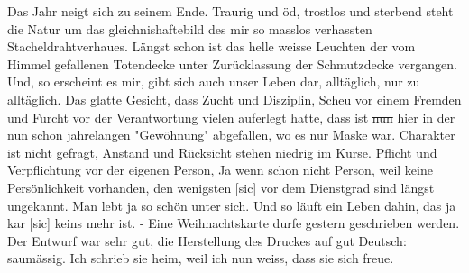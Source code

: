 \def\day{20. November 1942 *}
\mktitle

Das Jahr neigt sich zu seinem Ende.
Traurig und \"{o}d, trostlos und sterbend steht die Natur um das gleichnishaftebild des mir so masslos verhassten Stacheldrahtverhaues.
L\"{a}ngst schon ist das helle weisse Leuchten der vom Himmel gefallenen Totendecke unter Zur\"{u}cklassung der Schmutzdecke vergangen.
Und, so erscheint es mir, gibt sich auch unser Leben dar, allt\"{a}glich, nur zu allt\"{a}glich.
Das glatte Gesicht, dass Zucht und Disziplin, Scheu vor einem Fremden und Furcht vor der Verantwortung vielen auferlegt hatte, dass ist \st{nun} hier in der nun schon jahrelangen "Gew\"{o}hnung" abgefallen, wo es nur Maske war.
Charakter ist nicht gefragt, Anstand und R\"{u}cksicht stehen niedrig im Kurse.
Pflicht und Verpflichtung vor der eigenen Person, Ja wenn schon nicht Person, weil keine Pers\"{o}nlichkeit vorhanden, den wenigsten{\color{red} [sic] } vor dem Dienstgrad sind l\"{a}ngst ungekannt.
Man lebt ja so sch\"{o}n unter sich.
Und so l\"{a}uft ein Leben dahin, das ja kar{\color{red} [sic] } keins mehr ist.
- Eine Weihnachtskarte durfe gestern geschrieben werden.
Der Entwurf war sehr gut, die Herstellung des Druckes auf gut Deutsch: saum\"{a}ssig.
Ich schrieb sie heim, weil ich nun weiss, dass sie sich freue.

\clearpage
